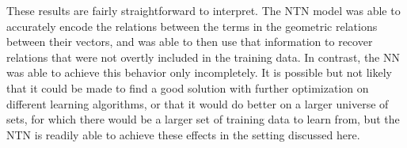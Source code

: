 



These results are fairly straightforward to interpret. The NTN model
was able to accurately encode the relations between the terms in the
geometric relations between their vectors, and was able to then use
that information to recover relations that were not overtly included
in the training data. In contrast, the NN was able to achieve this
behavior only incompletely. It is possible but not likely that it
could be made to find a good solution with further optimization on
different learning algorithms, or that it would do better on a larger
universe of sets, for which there would be a larger set of training
data to learn from, but the NTN is readily able to achieve these
effects in the setting discussed here.

